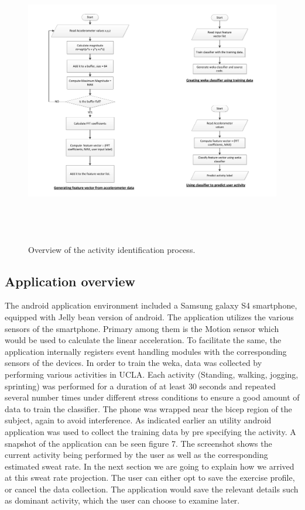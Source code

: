 \documentclass[conference]{IEEEtran}
\begin{document}
\begin{figure}
\centering
  \includegraphics[width=\textwidth,height=5in]{algorithm1.pdf}
  \caption{Overview of the activity identification process. }
\end{figure}

\subsection{Application overview}
The android application environment included a Samsung galaxy S4 smartphone, equipped with Jelly bean version of android. The application utilizes the various sensors of the smartphone. Primary among them is the Motion sensor which would be used to calculate the linear acceleration. To facilitate the same, the application internally registers event handling modules with the corresponding sensors of the devices. In order to train the weka, data was collected by performing various activities in UCLA. Each activity (Standing, walking, jogging, sprinting) was performed for a duration of at least 30 seconds and repeated several number times  under different stress conditions to ensure a good amount of data to train the classifier. The phone was wrapped near the bicep region of the subject, again to avoid interference. As indicated earlier an utility android application was used to collect the training data by pre specifying the activity. A snapshot of the application can be seen figure 7. The screenshot shows the current activity being performed by the user as well as the corresponding estimated sweat rate. In the next section we are going to explain how we arrived at this sweat rate projection. The user can either opt to save the exercise profile, or cancel the data collection. The application would save the relevant details such as dominant activity, which the user can choose to examine later.
\end{document}
